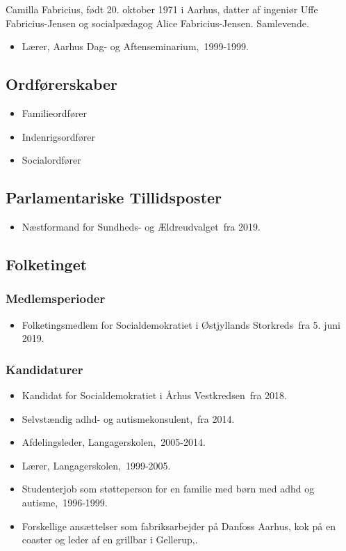 \documentclass[11pt, a4paper]{awesome-cv}
\begin{document}
\makecvheader[R]
\makelettertitle
\begin{cvletter}
Camilla Fabricius, født 20. oktober 1971 i Aarhus, datter af ingeniør Uffe Fabricius-Jensen og socialpædagog Alice Fabricius-Jensen. Samlevende.

\begin{itemize}
\item Lærer, Aarhus Dag- og Aftenseminarium, 1999-1999.
\end{itemize}
\subsection*{Ordførerskaber}
\begin{itemize}
\item Familieordfører
\item Indenrigsordfører
\item Socialordfører
\end{itemize}
\subsection*{Parlamentariske Tillidsposter}
\begin{itemize}
\item Næstformand for Sundheds- og Ældreudvalget fra 2019.
\end{itemize}
\subsection*{Folketinget}
\subsubsection*{Medlemsperioder}
\begin{itemize}
\item Folketingsmedlem for Socialdemokratiet i Østjyllands Storkreds fra 5. juni 2019.
\end{itemize}
\subsubsection*{Kandidaturer}
\begin{itemize}
\item Kandidat for Socialdemokratiet i Århus Vestkredsen fra 2018.
\end{itemize}
\begin{itemize}
\item Selvstændig adhd- og autismekonsulent, fra 2014.
\item Afdelingsleder, Langagerskolen, 2005-2014.
\item Lærer, Langagerskolen, 1999-2005.
\item Studenterjob som støtteperson for en familie med børn med adhd og autisme, 1996-1999.
\item Forskellige ansættelser som fabriksarbejder på Danfoss Aarhus, kok på en coaster og leder af en grillbar i Gellerup,.
\end{itemize}
\end{cvletter}
\end{document}
